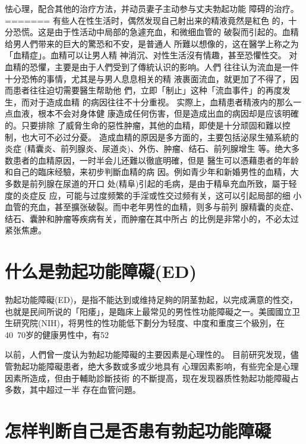 \documentclass[12pt,UTF8]{ctexbook}
\begin{document}
怯心理，配合其他的治疗方法，并动员妻子主动参与丈夫勃起功能
障碍的治疗。
=======
有些人在性生活时，偶然发现自己射出来的精液竟然是紅色
的，十分恐慌。这是由于性活动中局部的急遽充血，和微细血管的
破裂而引起的。血精给男人們带来的巨大的驚恐和不安，是普通人
所難以想像的，这在醫学上称之为「血精症」。血精可以让男人精
神消沉、对性生活沒有情趣，甚至恐懼性交。
对血精的恐懼，主要是由于人們受到了傳統认识的影响。人們
往往认为流血是一件十分恐怖的事情，尤其是与男人息息相关的精
液裹面流血，就更加了不得了，因而患者往往迫切需要醫生帮助他
們，立即「制止」这种「流血事件」的再度发生，而对于造成血精
的病因往往不十分重视。
实際上，血精患者精液内的那么一点血液，根本不会对身体健
康造成任何伤害，但是造成出血的病因却是应该明確的。只要排除
了威脅生命的惡性肿瘤，其他的血精，即使是十分顽固和難以控
制，也大可不必过分憂。
造成血精的原因是多方面的，主要包括泌尿生殖系統的炎症
(精囊炎、前列腺炎、尿道炎)、外伤、肿瘤、结石、前列腺增生
等。绝大多数患者的血精原因，一时半会儿还難以徹底明確，但是
醫生可以憑藉患者的年龄和自己的臨床经驗，来初步判斷血精的病
因。例如青少年和新婚男性的血精，大多数是前列腺在尿道的开口
处(精阜)引起的毛病，是由于精阜充血所致，屬于轻度的炎症反
应，可能与过度频繁的手淫或性交过频有关，这可以引起局部的细
小血管的充血，甚至擴张破裂。而中老年男性的血精，则多与前列
腺精囊的炎症、结石、囊肿和肿瘤等疾病有关，而肿瘤在其中所占
的比例是非常小的，不必太过紧张焦慮。

\section{什么是勃起功能障礙(ED)}

勃起功能障礙(ED)，是指不能达到或维持足夠的阴茎勃起，以完成满意的性交，也就是民间所说的「阳痿」，是臨床上最常见的男性性功能障礙之一。美國國立卫生研究院(NIH)，将男性的性功能低下劃分为轻度、中度和重度三个級別，在40~70岁的健康男性中，有52%

以前，人們曾一度认为勃起功能障礙的主要因素是心理性的。
目前研究发现，儘管勃起功能障礙患者，绝大多数或多或少地具有
心理因素影响，有些完全是心理因素所造成，但由于輔助診斷技術
的不斷提高，现在发现器质性勃起功能障礙占多数，其中超过一半
存在血管问題。

\section{怎样判断自己是否患有勃起功能障礙}
\end{document}
